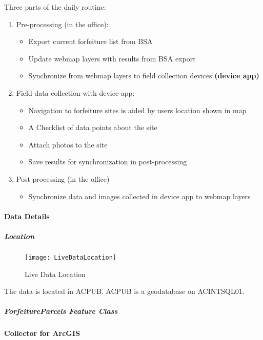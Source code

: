 \documentclass[class=article , crop=false, titlepage, twoside, multi={itemize, figure, verbatim}, float=false]{standalone}
\begin{document}
Three parts of the daily routine:
\begin{enumerate}
\item Pre-processing (in the office):

\begin{itemize}
\item Export current forfeiture list from BSA
\item Update webmap layers with results from BSA export
\item Synchronize from webmap layers to field collection devices \textbf{(device app)}
\end{itemize}

\item Field data collection with device app:

\begin{itemize}
\item Navigation to forfeiture sites is aided by users location shown in map
\item A Checklist of data points about the site
\item Attach photos to the site
\item Save results for synchronization in post-processing
\end{itemize}

\item Post-processing (in the office)

\begin{itemize}
\item Synchronize data and images collected in device app to webmap layers

\end{itemize}
\end{enumerate}



\clearpage
\paragraph{Data Details}
\subparagraph*{Location}

\begin{wrapfigure}{r}{0.5\textwidth}
\centering
\texttt{[image: LiveDataLocation]}
\caption{Live Data Location}
\end{wrapfigure}
The data is located in ACPUB.  ACPUB is a geodatabase on ACINTSQL01.
\clearpage


\subparagraph{ForfeitureParcels Feature Class}
\clearpage
\paragraph{Collector for ArcGIS}
\end{document}
